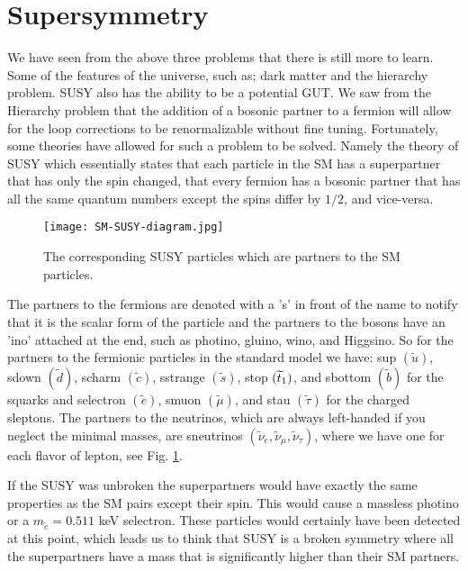 \section{Supersymmetry}\label{sec:SUSY}

We have seen from the above three problems that there is still more to learn. Some of the features of the universe, such as; dark matter and the hierarchy problem. SUSY also has the ability to be a potential GUT. We saw from the Hierarchy problem that the addition of a bosonic partner to a fermion will allow for the loop corrections to be renormalizable without fine tuning. Fortunately, some theories have allowed for such a problem to be solved. Namely the theory of SUSY which essentially states that each particle in the SM has a superpartner that has only the spin changed, that every fermion has a bosonic partner that has all the same quantum numbers except the spins differ by $1/2$, and vice-versa.

\begin{figure}
 	\centering
	\texttt{[image: SM-SUSY-diagram.jpg]}
 	\caption[Supersymmetry and Standard Model Particles]{The corresponding SUSY particles which are partners to the SM particles.}
 	\label{SUSYParticles} 
\end{figure}

The partners to the fermions are denoted with a 's' in front of the name to notify that it is the scalar form of the particle and the partners to the bosons have an 'ino' attached at the end, such as photino, gluino, wino, and Higgsino. So for the partners to the fermionic particles in the standard model we have: sup $(\widetilde{u})$, sdown $(\widetilde{d})$, scharm $(\widetilde{c})$, sstrange $(\widetilde{s})$, stop $(\widetilde{t}_1)$, and sbottom $(\widetilde{b})$ for the squarks and selectron $(\widetilde{e})$, smuon $(\widetilde{\mu})$, and stau $(\widetilde{\tau})$ for the charged sleptons. The partners to the neutrinos, which are always left-handed if you neglect the minimal masses, are sneutrinos $(\widetilde{\nu}_e, \widetilde{\nu}_\mu, \widetilde{\nu}_\tau)$, where we have one for each flavor of lepton, see Fig. \ref{SUSYParticles}. 

If the SUSY was unbroken the superpartners would have exactly the same properties as the SM pairs except their spin. This would cause a massless photino or a $m_{\widetilde{e}}=0.511$ keV selectron. These particles would certainly have been detected at this point, which leads us to think that SUSY is a broken symmetry where all the superpartners have a mass that is significantly higher than their SM partners. 

